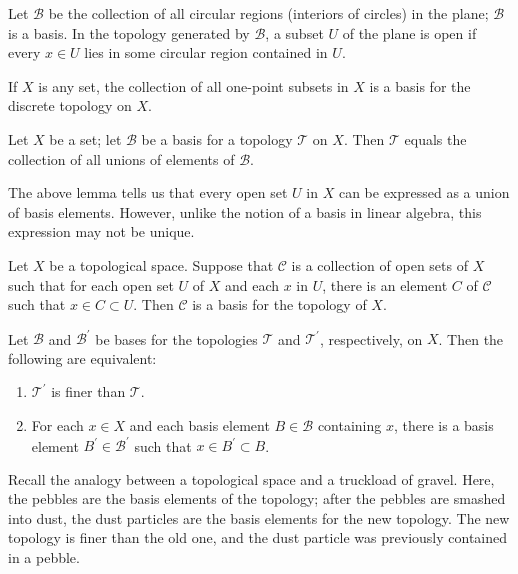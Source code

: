 \begin{eg}
Let $\mathscr{B}$ be the collection of all circular regions (interiors of circles) in the plane; $\mathscr{B}$ is a basis.
In the topology generated by $\mathscr{B}$, a subset $U$ of the plane is open if every $x \in U$ lies in some circular region contained in $U$.
\end{eg}

\begin{eg}
If $X$ is any set, the collection of all one-point subsets in $X$ is a basis for the discrete topology on $X$.
\end{eg}

\begin{lemma}
Let $X$ be a set; let $\mathscr{B}$ be a basis for a topology $\mathscr{T}$ on $X$. Then $\mathscr{T}$ equals the collection of
all unions of elements of $\mathscr{B}$.
\end{lemma}

\begin{remark}
The above lemma tells us that every open set $U$ in $X$ can be expressed as a union of basis elements. However, unlike the notion of a basis
in linear algebra, this expression may not be unique.
\end{remark}

\begin{lemma}
Let $X$ be a topological space. Suppose that $\mathscr{C}$ is a collection of open sets of $X$ such that for each open set $U$ of $X$ and each $x$ in $U$,
there is an element $C$ of $\mathscr{C}$ such that $x \in C \subset U$. Then $\mathscr{C}$ is a basis for the topology of $X$.
\end{lemma}

\begin{lemma}
Let $\mathscr{B}$ and $\mathscr{B}^{\prime}$ be bases for the topologies $\mathscr{T}$ and $\mathscr{T}^{\prime}$, respectively, on $X$. Then the following are equivalent:
\begin{enumerate}
    \item $\mathscr{T}^{\prime}$ is finer than $\mathscr{T}$.
    \item For each $x \in X$ and each basis element $B \in \mathscr{B}$ containing $x$, there is a basis element $B^{\prime} \in \mathscr{B}^{\prime}$ such that $x \in B^{\prime} \subset B$.
\end{enumerate}
\end{lemma}


\begin{intuition}
Recall the analogy between a topological space and a truckload of gravel. Here, the pebbles are the basis elements of the topology; 
after the pebbles are smashed into dust, the dust particles are the basis elements for the new topology. 
The new topology is finer than the old one, and the dust particle was previously contained in a pebble.
\end{intuition}

